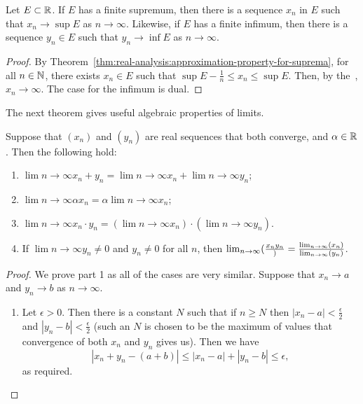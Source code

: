 \begin{theorem}
  Let \(E \subset \R\). If \(E\) has a finite supremum, then there is a sequence \(x_{n}\) in \(E\) such that \(x_{n} \to \sup E\) as \(n \to \infty\). Likewise, if \(E\) has a finite infimum, then there is a sequence \(y_{n} \in E\) such that \(y_{n} \to \inf E\) as \(n \to \infty\).
\end{theorem}

\begin{proof}
  By Theorem~\ref{thm:real-analysis:approximation-property-for-suprema}, for all \(n \in \N\), there exists \(x_{n} \in E\) such that \(\sup E - \frac{1}{n} \leq x_{n} \leq \sup E\). Then, by the~, \(x_{n} \to \infty\). The case for the infimum is dual.
\end{proof}

The next theorem gives useful algebraic properties of limits.

\begin{theorem}
  Suppose that \((x_{n})\) and \((y_{n})\) are real sequences that both converge, and \(\alpha \in \R\). Then the following hold:
  \begin{enumerate}
  \item \(\lim{n \to \infty}{x_{n} + y_{n}} = \lim{n \to \infty} {x_{n}} + \lim{n \to \infty}{y_{n}}\);
  \item \(\lim{n \to \infty}{\alpha x_{n}} = \alpha\lim{n \to \infty}{x_{n}}\);
  \item \(\lim{n \to \infty}{x_{n} \cdot y_{n}} = \left(\lim{n \to \infty}{x_{n}}\right) \cdot \left(\lim{n \to \infty}{y_{n}}\right)\).
  \item If \(\lim{n \to \infty}{y_{n}} \neq 0\) and \(y_{n} \neq 0\) for all \(n\), then \(\lim{n \to \infty}{\frac{x_{n}{y_{n}}}} = \frac{\lim{n \to \infty}{x_{n}}}{\lim{n \to \infty}{y_{n}}}\).
  \end{enumerate}
\end{theorem}

\begin{proof}
  We prove part 1 as all of the cases are very similar. Suppose that \(x_{n} \to a\) and \(y_{n} \to b\) as \(n \to \infty\).
  \begin{enumerate}
  \item Let \(\epsilon > 0\). Then there is a constant \(N\) such that if \(n \geq N\) then \(|x_{n} - a| < \frac \epsilon 2\) and \(|y_{n} - b| < \frac \epsilon 2\) (such an \(N\) is chosen to be the maximum of values that convergence of both \(x_{n}\) and \(y_{n}\) gives us). Then we have
    \[|x_{n} + y_{n} - (a + b) | \leq |x_{n} - a | + |y_{n} - b | \leq \epsilon,\]
    as required.
  \end{enumerate}
\end{proof}

